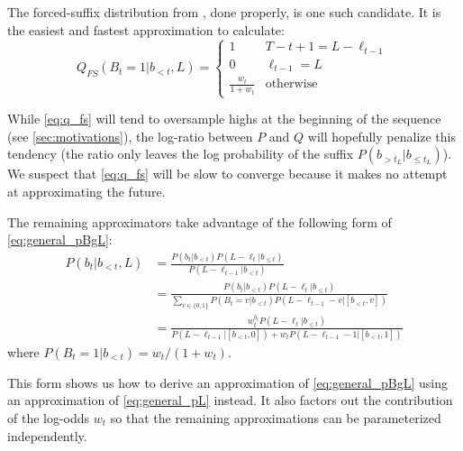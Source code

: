 \documentclass{article}
\begin{document}
The forced-suffix distribution from
\cite{luoLearningOnlineAlignments2017,lawsonLearningHardAlignments2018}, done
properly, is one such candidate. It is the easiest and fastest approximation to
calculate:
%
\begin{equation} \label{eq:q_fs}
    Q_{FS}(B_t=1|b_{<t}, L) = \begin{cases}
        1 & T - t + 1 = L - \ell_{t-1} \\
        0 & \ell_{t-1} = L \\
        \frac{w_t}{1 + w_t} & \mathrm{otherwise}
    \end{cases}
\end{equation}

While \cref{eq:q_fs} will tend to oversample highs at the beginning of the
sequence (see \cref{sec:motivations}), the log-ratio between $P$ and $Q$ will
hopefully penalize this tendency (the ratio only leaves the log probability of
the suffix $P(b_{> t_L}|b_{\leq t_L})$). We suspect that \cref{eq:q_fs} will
be slow to converge because it makes no attempt at approximating the future.

The remaining approximators take advantage of the following form of
\cref{eq:general_pBgL}:
%
\begin{equation} \label{eq:general_pBgL_alt}
\begin{split}
    P(b_t|b_{<t}, L)
    &=  \frac{P(b_t|b_{<t})P(L - \ell_t|b_{\leq t})}
        {P(L - \ell_{t-1}|b_{<t})} \\
    &= \frac{P(b_t|b_{<t})P(L - \ell_t|b_{\leq t})}
       {\sum_{v \in \{0,1\}} P(B_t=v|b_{<t})P(L - \ell_{t-1} - v|[b_{<t}, v])} \\
    &= \frac{w_t^{b_t}P(L - \ell_t|b_{\leq t})}
        {P(L - \ell_{t-1}|[b_{<t}, 0]) + w_t P(L - \ell_{t-1} - 1|[b_{<t}, 1])}
\end{split}
\end{equation}
%
where $P(B_t=1|b_{<t}) = w_t / (1 + w_t)$.

This form shows us how to derive an approximation of \cref{eq:general_pBgL}
using an approximation of \cref{eq:general_pL} instead. It also factors out
the contribution of the log-odds $w_t$ so that the remaining approximations
can be parameterized independently.
\end{document}
